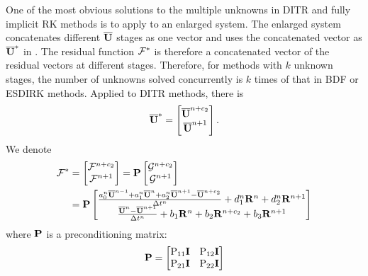 One of the most obvious solutions to the multiple unknowns
in DITR and fully implicit RK methods is to apply
 to an enlarged
system.
The enlarged system concatenates different $\overline{\mathbf{U}}$
stages as one vector and uses the concatenated vector as
$\overline{\mathbf{U}}^*$ in .
The residual function $\mathcal{F}^*$ is therefore a concatenated vector of
the residual vectors at different stages.
Therefore, for methods with $k$ unknown stages, the number of
unknowns solved concurrently is $k$ times of that in BDF or ESDIRK methods.
Applied to DITR methods, there is
\begin{equation}
    \overline{\mathbf{U}}^* = \begin{bmatrix}
        \overline{\mathbf{U}}^{n+c_2} \\
        \overline{\mathbf{U}}^{n+1}
    \end{bmatrix}.
\end{equation}
We denote
\begin{equation}
    \begin{aligned}
        \mathcal{F}^* & =\begin{bmatrix}
                     \mathcal{F}^{n+c_2} \\
                     \mathcal{F}^{n+1}
                 \end{bmatrix} = \mathbf{P}\begin{bmatrix}
                                        \mathcal{G}^{n+c_2} \\
                                        \mathcal{G}^{n+1}
                                    \end{bmatrix} \\ & = \mathbf{P}\begin{bmatrix}
            \frac{a^n_0\overline{\mathbf{U}}^{n - 1} +
                a^n_1\overline{\mathbf{U}}^{n} +
                a^n_2\overline{\mathbf{U}}^{n + 1} - \overline{\mathbf{U}}^{n+c_2}}{{\Delta} t^n}
            +
            d^n_1\mathbf{R}^{n} +
            d^n_2\mathbf{R}^{n + 1}
            \\
            \frac{\overline{\mathbf{U}}^{n} - \overline{\mathbf{U}}^{n+1}}{{\Delta} t^n}  +
            b_1 \mathbf{R}^n +
            b_2 \mathbf{R}^{n+c_2} +
            b_3 \mathbf{R}^{n+1}
        \end{bmatrix}
        \label{eq:DITRFFDef}
    \end{aligned}
\end{equation}
where $\mathbf{P}$ is a preconditioning matrix:
\begin{equation}
    \mathbf{P} = \begin{bmatrix}
        \mathrm{P}_{11}\mathbf{I} & \mathrm{P}_{12}\mathbf{I} \\
        \mathrm{P}_{21}\mathbf{I} & \mathrm{P}_{22}\mathbf{I} \\
    \end{bmatrix}
\end{equation}
